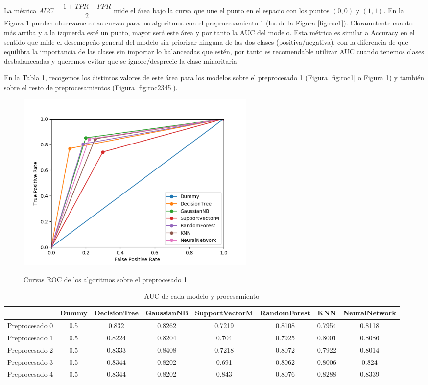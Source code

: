 \documentclass[oneside]{book}
\begin{document}
La métrica $AUC=\dfrac{1+TPR-FPR}{2}$ mide el área bajo la curva que
une el punto en el espacio con los puntos $(0,0)$ y $(1,1)$. En la
Figura \ref{fig:roc-auc} pueden observarse estas curvas para los
algoritmos con el preprocesamiento 1 (los de la Figura
\ref{fig:roc1}). Clarametente cuanto más arriba y a la izquierda esté
un punto, mayor será este área y por tanto la AUC del modelo. Esta
métrica es similar a Accuracy en el sentido que mide el desemepeño
general del modelo sin priorizar ninguna de las dos clases
(positiva/negativa), con la diferencia de que equilibra la importancia
de las clases sin importar lo balanceadas que estén, por tanto es
recomendable utilizar AUC cuando tenemos clases desbalanceadas y
queremos evitar que se ignore/desprecie la clase minoritaria.

En la Tabla \ref{tab:auc}, recogemos los distintos valores de este
área para los modelos sobre el preprocesado 1 (Figura \ref{fig:roc1} o
Figura \ref{fig:roc-auc}) y también sobre el resto de preprocesamientos (Figura \ref{fig:roc2345}).

\begin{figure}[H]
  \centering
  \caption{Curvas ROC de los algoritmos sobre el preprocesado 1}
  \includegraphics[width=120mm]{figures/visualizacion/roc-auc}
  \label{fig:roc-auc}
\end{figure}

\begin{table}[H]
  \centering
  \begin{tabular}{|l|ccccccc|} \hline
     & Dummy & DecisionTree & GaussianNB & SupportVectorM & RandomForest & KNN & NeuralNetwork \\ \hline
Preprocesado 0 & 0.5 & 0.832 & 0.8262 & 0.7219 & 0.8108 & 0.7954 & 0.8118 \\ \hline
Preprocesado 1 & 0.5 & 0.8224 & 0.8204 & 0.704 & 0.7925 & 0.8001 & 0.8086 \\ \hline
Preprocesado 2 & 0.5 & 0.8333 & 0.8408 & 0.7218 & 0.8072 & 0.7922 & 0.8014 \\ \hline
Preprocesado 3 & 0.5 & 0.8344 & 0.8202 & 0.691 & 0.8062 & 0.8006 & 0.824 \\ \hline
Preprocesado 4 & 0.5 & 0.8344 & 0.8202 & 0.843 & 0.8076 & 0.8288 & 0.8339 \\ \hline
  \end{tabular}
  \caption{AUC de cada modelo y procesamiento}
  \label{tab:auc}
\end{table}
\end{document}

